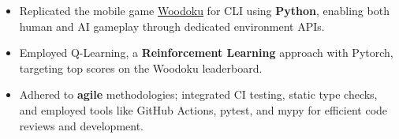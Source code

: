 \documentclass[10pt,a4paper,ragged2e,withhyper]{altacv}
\begin{document}
\begin{paracol}{2}

\divider{}


\begin{itemize}

    \item Replicated the mobile game \href{https://play.google.com/store/apps/details?id=com.tripledot.woodoku&hl=en_CA&gl=US}{Woodoku} for CLI using \textbf{Python}, enabling both human and AI gameplay through dedicated environment APIs.
    \item Employed Q-Learning, a \textbf{Reinforcement Learning} approach with Pytorch, targeting top scores on the Woodoku leaderboard.
    \item Adhered to \textbf{agile} methodologies; integrated CI testing, static type checks, and employed tools like GitHub Actions, pytest, and mypy for efficient code reviews and development.

\end{itemize}








\end{paracol}
\end{document}
